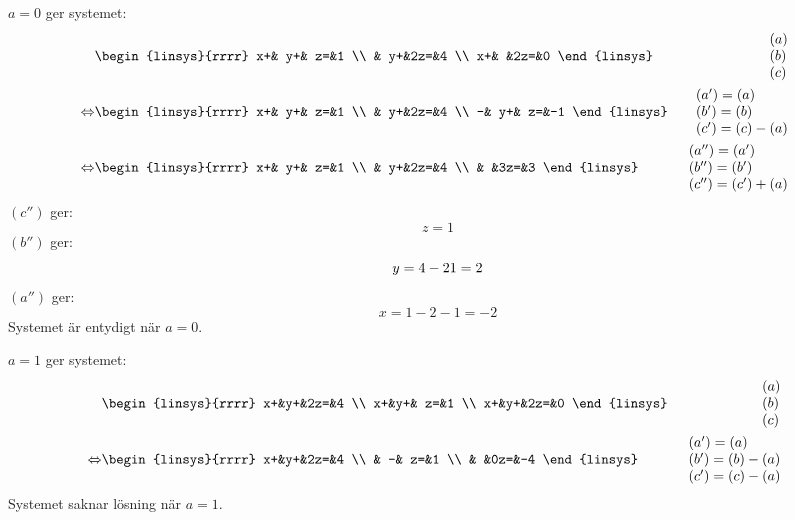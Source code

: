 \begin{task}{1.18}
	$a=0$ ger systemet:
	\begin{align*}
		&\begin{linsys}{rrrr}
			x+& y+& z=&1 \\
			  & y+&2z=&4 \\
			x+&   &2z=&0
		\end{linsys}
		&\begin{array}{l} 
			(a) \\ 
			(b) \\
			(c)
		\end{array} \\ \lra
		&\begin{linsys}{rrrr}
			x+& y+& z=&1 \\
			  & y+&2z=&4 \\
			 -& y+& z=&-1
		\end{linsys}
		&\begin{array}{l} 
			(a')=(a) \\ 
			(b')=(b) \\
			(c')=(c)-(a)
		\end{array} \\ \lra
		&\begin{linsys}{rrrr}
			x+& y+& z=&1 \\
			  & y+&2z=&4 \\
			  &   &3z=&3
		\end{linsys}
		&\begin{array}{l} 
			(a'')=(a') \\ 
			(b'')=(b') \\
			(c'')=(c')+(a)
		\end{array}
	\end{align*}
	$(c'')$ ger:
	\[z=1\]
	$(b'')$ ger:
	\[y=4-2\*1=2\]
	$(a'')$ ger:
	\[x=1-2-1=-2\]
	Systemet är entydigt när $a=0$.

	$a=1$ ger systemet:
	\begin{align*}
		&\begin{linsys}{rrrr}
			x+&y+&2z=&4 \\
			x+&y+& z=&1 \\
			x+&y+&2z=&0
		\end{linsys}
		&\begin{array}{l} 
			(a) \\ 
			(b) \\
			(c)
		\end{array} \\ \lra
		&\begin{linsys}{rrrr}
			x+&y+&2z=&4 \\
			  & -& z=&1 \\
			  &  &0z=&-4
		\end{linsys}
		&\begin{array}{l} 
			(a')=(a) \\ 
			(b')=(b)-(a) \\
			(c')=(c)-(a)
		\end{array}
	\end{align*}
	Systemet saknar lösning när $a=1$.


\end{task}
